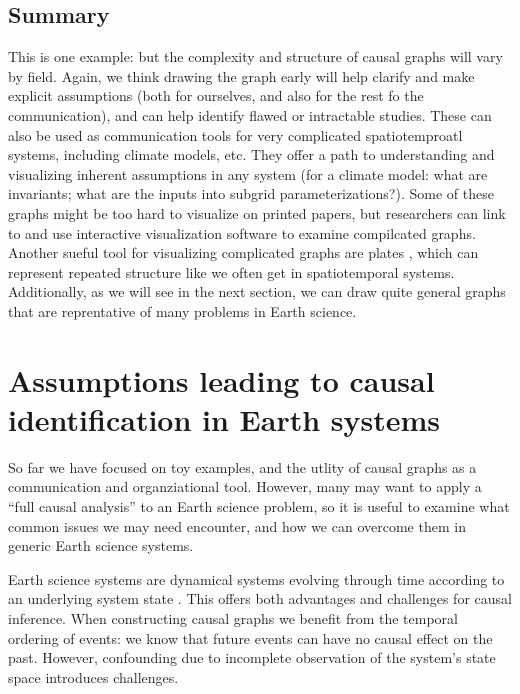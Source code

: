 \documentclass[12pt]{article}
\begin{document}
\subsection{Summary}

This is one example: but the complexity and structure of causal graphs
will vary by field. Again, we think drawing the graph early will help
clarify and make explicit assumptions (both for ourselves, and also
for the rest fo the communication), and can help identify flawed or
intractable studies. These can also be used as communication tools for
very complicated spatiotemproatl systems, including climate models,
etc. They offer a path to understanding and visualizing inherent
assumptions in any system (for a climate model: what are invariants;
what are the inputs into subgrid parameterizations?). Some of these
graphs might be too hard to visualize on printed papers, but
researchers can link to and use interactive visualization software to
examine compilcated graphs. Another sueful tool for visualizing
complicated graphs are plates \citep{bishop2006pattern}, which can
represent repeated structure like we often get in spatiotemporal
systems. Additionally, as we will see in the next section, we can draw
quite general graphs that are reprentative of many problems in Earth
science.


\section{Assumptions leading to causal identification in Earth
  systems}
\label{sec:necess-cond-caus}

So far we have focused on toy examples, and the utlity of causal
graphs as a communication and organziational tool. However, many may
want to apply a ``full causal analysis'' to an Earth science problem,
so it is useful to examine what common issues we may need encounter,
and how we can overcome them in generic Earth science systems.

Earth science systems are dynamical systems evolving through time
according to an underlying system state
\citep{lorenz-1963,lorenz1996predictability,majda-state}. This offers
both advantages and challenges for causal inference. When constructing
causal graphs we benefit from the temporal ordering of events: we know
that future events can have no causal effect on the past. However,
confounding due to incomplete observation of the system's state space
introduces challenges.
\end{document}
